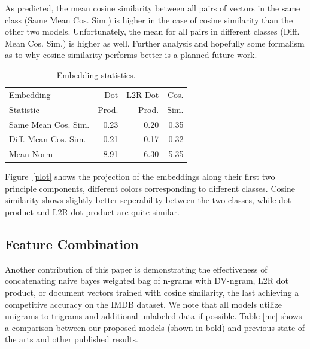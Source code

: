 \documentclass[11pt,a4paper]{article}
\begin{document}
As predicted, the mean cosine similarity between all pairs of vectors in the same class (Same Mean Cos. Sim.) is higher in the case of cosine similarity than the other two models. Unfortunately, the mean for all pairs in different classes (Diff. Mean Cos. Sim.) is higher as well. Further analysis and hopefully some formalism as to why cosine similarity performs better is a planned future work.

\begin{table}[h]
	\centering
	\small
	\begin{tabular}{@{\hskip6pt}lrrr@{\hskip6pt}}
		\toprule
		Embedding & Dot  &  L2R Dot &  Cos. \\ 
		Statistic&Prod.  & Prod.  & Sim. \\
		\midrule
		Same Mean Cos. Sim. & 0.23 & 0.20 & 0.35\\
		Diff. Mean Cos. Sim. & 0.21 & 0.17 & 0.32\\ 
		Mean Norm & 8.91 & 6.30 & 5.35\\
		\bottomrule
	\end{tabular}
	\caption{Embedding statistics.}
	\label{es}
\end{table}

Figure~\ref{plot} shows the projection of the embeddings along their first two principle components, different colors corresponding to different classes. Cosine similarity shows slightly better seperability between the two classes, while dot product and L2R dot product are quite similar.

\subsection{Feature Combination}

Another contribution of this paper is demonstrating the effectiveness of concatenating naive bayes weighted bag of n-grams with DV-ngram, L2R dot product, or document vectors trained with cosine similarity, the last achieving a competitive accuracy on the IMDB dataset. We note that all models utilize unigrams to trigrams and additional unlabeled data if possible. 
Table \ref{mc} shows a comparison between our
proposed models (shown in bold) and previous
state of the arts and other published results. 
\end{document}
